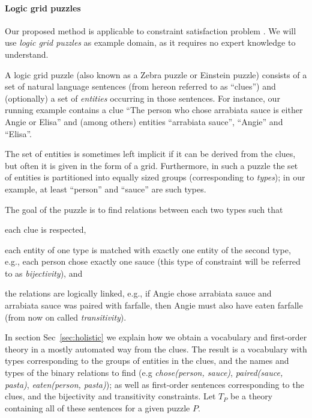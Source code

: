


\paragraph{Logic grid puzzles}
Our proposed method is applicable to constraint satisfaction problem . We will use \textit{logic grid puzzles} as example domain, as it requires no expert knowledge to understand.

A logic grid puzzle (also known as a Zebra puzzle or Einstein puzzle) consists of a set of natural language sentences (from hereon referred to as ``clues'') and (optionally) a set of \emph{entities} occurring in those sentences. 
For instance, our running example contains a clue ``The person who chose arrabiata sauce is either Angie or Elisa'' and (among others) entities ``arrabiata sauce'', ``Angie'' and ``Elisa''. 

The set of entities is sometimes left implicit if it can be derived from the clues, but often it is given in the form of a grid. Furthermore, in such a puzzle the set of entities is partitioned into equally sized groups (corresponding to \emph{types}); in our example, at least ``person'' and ``sauce'' are such types. 

The goal of the puzzle is to find relations between each two types such that
\begin{compactitem}
	\item each clue is respected, 
	\item each entity of one type is matched with exactly one entity of the second type, e.g., each person chose exactly one sauce (this type of constraint will be referred to as \emph{bijectivity}), and 
	\item the relations are logically linked, e.g., if Angie chose arrabiata sauce and arrabiata sauce was paired with farfalle, then Angie must also have eaten farfalle (from now on called \emph{transitivity}). 
\end{compactitem}
In section Sec~\ref{sec:holistic} we explain how we obtain a vocabulary and first-order theory in a mostly automated way from the clues. The result is a vocabulary with types corresponding to the groups of entities in the clues, and the names and types of the binary relations to find (e.g \textit{chose(person, sauce)}, \textit{paired(sauce, pasta)}, \textit{eaten(person, pasta)});
as well as first-order sentences corresponding to the clues, and the bijectivity and transitivity constraints. Let $T_P$ be a theory containing all of these sentences for a given puzzle $P$.

